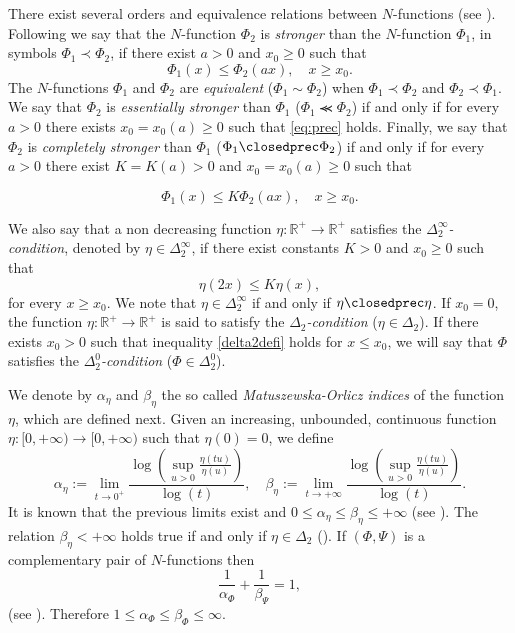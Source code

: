 \documentclass[twoside]{article}
\theoremstyle{remark}
\renewcommand{\leq}{\leqslant}
\renewcommand{\geq}{\geqslant}
\begin{document}
There exist several orders and equivalence relations between $N$-functions (see \cite[Sec. 2.2]{rao1991theory}).
Following \cite[Def. 1, pp. 15-16]{rao1991theory} we say that the   $N$-function $\Phi_2$ is \emph{stronger} than the $N$-function  $\Phi_1$, in symbols  $\Phi_1\prec\Phi_2$, if  there exist $a>0$ and $x_0\geq 0$ such that
\begin{equation}\label{eq:prec}\Phi_1(x)\leq \Phi_2(ax), \quad x\geq x_0.\end{equation}
 The $N$-functions  $\Phi_1$ and   $\Phi_2$ are \emph{equivalent} ($\Phi_1\sim\Phi_2$)  when  $\Phi_1\prec\Phi_2$ and $\Phi_2\prec\Phi_1$.
We say that  $\Phi_2$ is \emph{essentially stronger} than  $\Phi_1$  ($\Phi_1\llcurly\Phi_2$) if and only if for every $a>0$ there exists $x_0=x_0(a)\geq 0$ such that \eqref{eq:prec} holds. Finally, we say that  $\Phi_2$ is \emph{completely stronger} than  $\Phi_1$  ($\Phi_1\closedprec\Phi_2$) if and only if for every $a>0$ there exist $K=K(a)>0$ and  $x_0=x_0(a)\geq 0$ such that


\begin{equation}\label{eq:prec2}\Phi_1(x)\leq K\Phi_2(ax), \quad x\geq x_0.\end{equation}


We also say that a non decreasing function $\eta:\mathbb{R}^+\rightarrow \mathbb{R}^+$ satisfies the  \emph{$\Delta_2^{\infty}$-condition}, denoted by $\eta \in \Delta_2^{\infty}$,
if there exist  constants $K>0$ and  $x_0\geq 0$ such that
\begin{equation}\label{delta2defi}\eta(2x)\leq K\eta(x),
\end{equation}
for every $x\geq x_0$. We note that $\eta \in \Delta_2^{\infty}$ if and only if $\eta\closedprec\eta$.
If $x_0=0$,  the function   $\eta:\mathbb{R}^+\rightarrow \mathbb{R}^+$ is said to satisfy the 
\emph{$\Delta_2$-condition} ($\eta \in \Delta_2$). 
If there exists $x_0>0$ such that  inequality \eqref{delta2defi} holds for $x\leq x_0$, 
we will say that $\Phi$ satisfies the 
\emph{$\Delta_2^0$-condition} ($\Phi\in\Delta_2^0$).

We denote by $\alpha_{\eta}$ and $\beta_{\eta}$ the so called  \emph{Matuszewska-Orlicz indices} of the function $\eta$, which are defined next. Given
an increasing, unbounded, continuous function   $\eta:[ 0,+\infty)\to [0,+\infty)$ such that $\eta(0)=0$, we define
\begin{equation}\label{MO_indices}
    \alpha_{\eta}:=\lim\limits_{t\to 0^{+}}\frac{\log \left (\sup\limits_{u>0}\frac{\eta(t u)}{\eta(u)} \right ) }{\log(t)},\quad
    \beta_{\eta}:=\lim\limits_{t\to +\infty}\frac{\log \left  (\sup\limits_{u>0}\frac{\eta(t u)}{\eta(u)}\right )}{\log(t)}.
\end{equation}
It is known that the previous limits exist and  $0\leq \alpha_{\eta}\leq \beta_{\eta}\leq +\infty$ 
(see \cite[p. 84]{M}). The relation $\beta_{\eta}<+\infty$ holds true if and only if $\eta \in \Delta_2$
(\cite[Thm. 11.7]{M}). If $(\Phi,\Psi)$ is a complementary pair of  $N$-functions then
\begin{equation}\label{compl_ind}
 \frac{1}{\alpha_{\Phi}}+\frac{1}{\beta_{\Psi}}=1,
\end{equation}
(see \cite[Cor. 11.6]{M}). Therefore $1\leq \alpha_{\Phi}\leq\beta_{\Phi}\leq \infty $.
\end{document}
